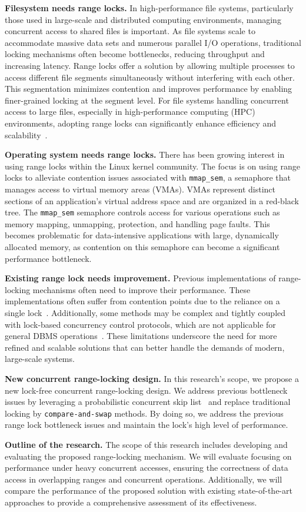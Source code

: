 \textbf{Filesystem needs range locks.}
In high-performance file systems, particularly those used in large-scale and distributed computing environments, managing concurrent access to shared files is important. As file systems scale to accommodate massive data sets and numerous parallel I/O operations, traditional locking mechanisms often become bottlenecks, reducing throughput and increasing latency. Range locks offer a solution by allowing multiple processes to access different file segments simultaneously without interfering with each other. This segmentation minimizes contention and improves performance by enabling finer-grained locking at the segment level. For file systems handling concurrent access to large files, especially in high-performance computing (HPC) environments, adopting range locks can significantly enhance efficiency and scalability~\parencite{gao2023citron, lee2021concurrent}.

\textbf{Operating system needs range locks.}
There has been growing interest in using range locks within the Linux kernel community. The focus is on using range locks to alleviate contention issues associated with \texttt{mmap\_sem}, a semaphore that manages access to virtual memory areas (VMAs). VMAs represent distinct sections of an application's virtual address space and are organized in a red-black tree. The \texttt{mmap\_sem} semaphore controls access for various operations such as memory mapping, unmapping, protection, and handling page faults. This becomes problematic for data-intensive applications with large, dynamically allocated memory, as contention on this semaphore can become a significant performance bottleneck.

\textbf{Existing range lock needs improvement.}
Previous implementations of range-locking mechanisms often need to improve their performance. These implementations often suffer from contention points due to the reliance on a single lock~\parencite{linuxRangeLockImpl2013, song2013parallelizing}. Additionally, some methods may be complex and tightly coupled with lock-based concurrency control protocols, which are not applicable for general DBMS operations~\parencite{graefe2007hierarchical, andy2022database}. These limitations underscore the need for more refined and scalable solutions that can better handle the demands of modern, large-scale systems.

\textbf{New concurrent range-locking design.} In this research's scope, we propose a new lock-free concurrent range-locking design. We address previous bottleneck issues by leveraging a probabilistic concurrent skip list~\parencite{herlihy2006provably, herlihy2020art} and replace traditional locking by \texttt{compare-and-swap} methods. By doing so, we address the previous range lock bottleneck issues and maintain the lock's high level of performance.

\textbf{Outline of the research.} The scope of this research includes developing and evaluating the proposed range-locking mechanism. We will evaluate focusing on performance under heavy concurrent accesses, ensuring the correctness of data access in overlapping ranges and concurrent operations. Additionally, we will compare the performance of the proposed solution with existing state-of-the-art approaches to provide a comprehensive assessment of its effectiveness.